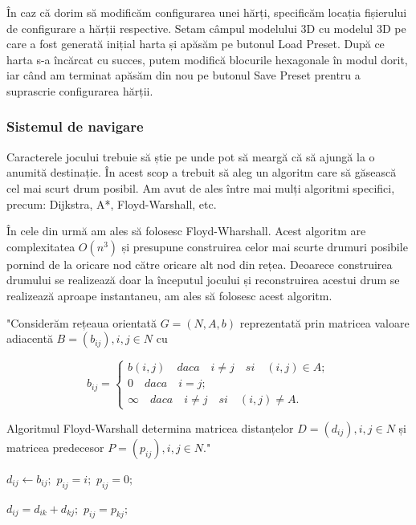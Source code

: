 \documentclass[12pt, a4paper]{article}
\begin{document}
	În caz că dorim să modificăm configurarea unei hărți, specificăm locația fișierului de configurare a hărții respective. Setam câmpul modelului 3D cu modelul 3D pe care a fost generată inițial harta și apăsăm pe butonul Load Preset. După ce harta s-a încărcat cu succes, putem modifică blocurile hexagonale în modul dorit, iar când am terminat apăsăm din nou pe butonul Save Preset prentru a suprascrie configurarea hărții.
	\newline
	
	
	
	
	
	\subsubsection{Sistemul de navigare}

	Caracterele jocului trebuie să știe pe unde pot să meargă că să ajungă la o anumită destinație. În acest scop a trebuit să aleg un algoritm care să găsească cel mai scurt drum posibil. Am avut de ales între mai mulți algoritmi specifici, precum: Dijkstra, A*, Floyd-Warshall, etc.
	\newline
	
 	În cele din urmă am ales să folosesc Floyd-Wharshall. Acest algoritm are complexitatea $O(n^3)$ și presupune construirea celor mai scurte drumuri posibile pornind de la oricare nod către oricare alt nod din rețea. Deoarece construirea drumului se realizează doar la începutul jocului și reconstruirea acestui drum se realizează aproape instantaneu, am ales să folosesc acest algoritm.
	\newline
	
	"Considerăm rețeaua orientată $G = (N, A, b)$ reprezentată prin matricea valoare adiacentă $B = (b_{ij}), i, j \in N$ cu
	
	\begin{equation*}
		b_{ij} = \begin{cases}
			b(i, j) \quad daca \quad i \neq j \quad si \quad (i, j) \in A; \\
			0 \quad daca \quad i = j; \\
			\infty \quad daca \quad i \neq j \quad si \quad (i, j) \neq A.
		\end{cases}
	\end{equation*}

	Algoritmul Floyd-Warshall determina matricea distanțelor $D = (d_{ij}), i, j \in N$ și matricea predecesor $P = (p_{ij}), i, j \in N$." \cite{grafuriAnul2}
	
	\begin{algorithmic}
					\State $d_{ij} \gets b_{ij};$
						\State $p_{ij} = i;$
					\Else
						\State $p_{ij} = 0;$
					\EndIf
				\EndFor
			\EndFor
			
							\State $d_{ij} = d_{ik} + d_{kj};$
							\State $p_{ij} = p_{kj};$
						\EndIf
					\EndFor
				\EndFor
			\EndFor
		\EndFunction
	\end{algorithmic}
\end{document}
